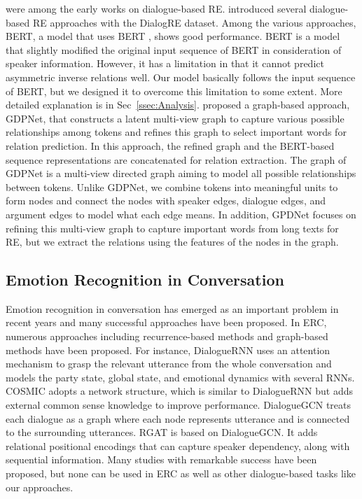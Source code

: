 \documentclass[11pt]{article}
\begin{document}
\citep{yu-etal-2020-dialogue, DBLP:conf/aaai/XueSZC21} were among the early works on dialogue-based RE. \citet{yu-etal-2020-dialogue} introduced several dialogue-based RE approaches with the DialogRE dataset. Among the various approaches, BERT, a model that uses BERT \citep{devlin-etal-2019-bert}, shows good performance. BERT is a model that slightly modified the original input sequence of BERT in consideration of speaker information. However, it has a limitation in that it cannot predict asymmetric inverse relations well. 
Our model basically follows the input sequence of BERT, but we designed it to overcome this limitation to some extent. More detailed explanation is in Sec~\ref{ssec:Analysis}. \citet{DBLP:conf/aaai/XueSZC21} proposed a graph-based approach, GDPNet, that constructs a latent multi-view graph to capture various possible relationships among tokens and refines this graph to select important words for relation prediction. In this approach, the refined graph and the BERT-based sequence representations are concatenated for relation extraction. 
The graph of GDPNet is a multi-view directed graph aiming to model all possible relationships between tokens. Unlike GDPNet, we combine tokens into meaningful units to form nodes and connect the nodes with speaker edges, dialogue edges, and argument edges to model what each edge means. In addition, GPDNet focuses on refining this multi-view graph to capture important words from long texts for RE, but we extract the relations using the features of the nodes in the graph.

\subsection{Emotion Recognition in Conversation}
Emotion recognition in conversation has emerged as an important problem in recent years and many successful approaches have been proposed. In ERC, numerous approaches including recurrence-based methods \citep{MajumderPHMGC19, ghosal-etal-2020-cosmic} and graph-based methods \citep{ghosal-etal-2019-dialoguegcn, ishiwatari-etal-2020-relation} have been proposed. For instance, DialogueRNN \citep{MajumderPHMGC19} uses an attention mechanism to grasp the relevant utterance from the whole conversation and models the party state, global state, and emotional dynamics with several RNNs. COSMIC \citep{ghosal-etal-2020-cosmic} adopts a network structure, which is similar to DialogueRNN but adds external common sense knowledge to improve performance. DialogueGCN \citep{ghosal-etal-2019-dialoguegcn} treats each dialogue as a graph where each node represents utterance and is connected to the surrounding utterances. RGAT \citep{ishiwatari-etal-2020-relation} is based on DialogueGCN. It adds relational positional encodings that can capture speaker dependency, along with sequential information. Many studies with remarkable success have been proposed, but none can be used in ERC as well as other dialogue-based tasks like our approaches.
\end{document}
